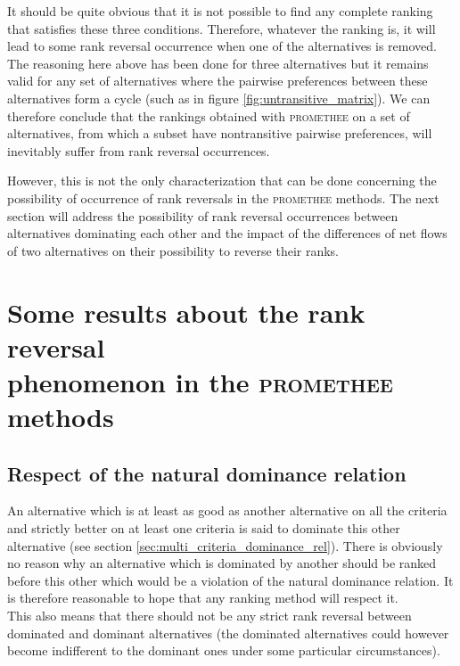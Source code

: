 It should be quite obvious that it is not possible to find any complete ranking that satisfies these three conditions.
Therefore, whatever the ranking is, it will lead to some rank reversal occurrence when one of the alternatives is removed.\\
The reasoning here above has been done for three alternatives but it remains valid for any set of alternatives where the pairwise preferences between these alternatives form a cycle (such as in figure \ref{fig:untransitive_matrix}).
We can therefore conclude that the rankings obtained with \textsc{promethee} on a set of alternatives, from which a subset have nontransitive pairwise preferences, will inevitably suffer from rank reversal occurrences.

However, this is not the only characterization that can be done concerning the possibility of occurrence of rank reversals in the \textsc{promethee} methods.
The next section will address the possibility of rank reversal occurrences between alternatives dominating each other and the impact of the differences of net flows of two alternatives on their possibility to reverse their ranks. %


\section{Some results about the rank reversal \\ phenomenon in the \textsc{promethee} methods}

\subsection{Respect of the natural dominance relation} \label{sec:pii_respect_dominance}

An alternative which is at least as good as another alternative on all the criteria and strictly better on at least one criteria is said to dominate this other alternative (see section \ref{sec:multi_criteria_dominance_rel}).
There is obviously no reason why an alternative which is dominated by another should be ranked before this other which would be a violation of the natural dominance relation.
It is therefore reasonable to hope that any ranking method will respect it.\\
This also means that there should not be any strict rank reversal between dominated and dominant alternatives (the dominated alternatives could however become indifferent to the dominant ones under some particular circumstances).

